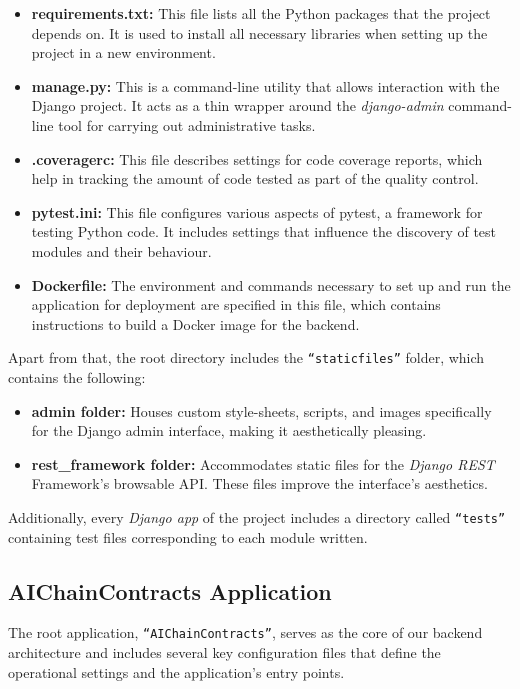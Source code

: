 \begin{itemize}
    \item \textbf{requirements.txt:} This file lists all the Python packages that the project depends on. It is used to install all necessary libraries when setting up the project in a new environment.
    \item \textbf{manage.py:} This is a command-line utility that allows interaction with the Django project. It acts as a thin wrapper around the \textit{django-admin} command-line tool for carrying out administrative tasks.
    \item \textbf{.coveragerc:} This file describes settings for code coverage reports, which help in tracking the amount of code tested as part of the quality control. 
    \item \textbf{pytest.ini:} This file configures various aspects of pytest, a framework for testing Python code. It includes settings that influence the discovery of test modules and their behaviour.
    \item \textbf{Dockerfile:} The environment and commands necessary to set up and run the application for deployment are specified in this file, which contains instructions to build a Docker image for the backend.
\end{itemize}

Apart from that, the root directory includes the \texttt{``staticfiles''} folder, which contains the following:

\begin{itemize}
    \item \textbf{admin folder:} Houses custom style-sheets, scripts, and images specifically for the Django admin interface, making it aesthetically pleasing.
    \item \textbf{rest\_framework folder:} Accommodates static files for the \textit{Django REST} Framework's browsable API. These files improve the interface's aesthetics.
\end{itemize}

Additionally, every \textit{Django app} of the project includes a directory called \texttt{``tests''} containing test files corresponding to each module written.

\subsection{AIChainContracts Application}

The root application, \texttt{``AIChainContracts''}, serves as the core of our backend architecture and includes several key configuration files that define the operational settings and the application's entry points.

